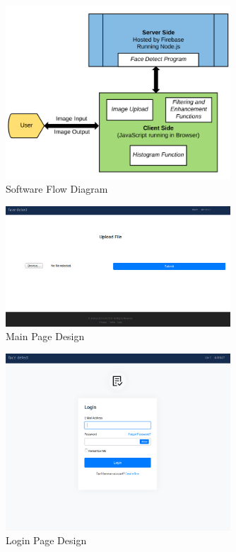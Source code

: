 \documentclass{article}
\begin{document}
  \begin{figure}[!htb]
    \centering
    \includegraphics[width=0.75\textwidth]{assets/Software_Flow_Diagram.png}
    \caption{Software Flow Diagram}
    \label{fig:flow-diagram}
  \end{figure}

  \begin{figure}[!htb]
    \centering
    \includegraphics[width=0.75\textwidth]{assets/main_page.png}
    \caption{Main Page Design}
    \label{fig:main-page}
  \end{figure}

  \begin{figure}[!htb]
    \centering
    \includegraphics[width=0.75\textwidth]{assets/login.png}
    \caption{Login Page Design}
    \label{fig:login-page}
  \end{figure}
  
\end{document}
